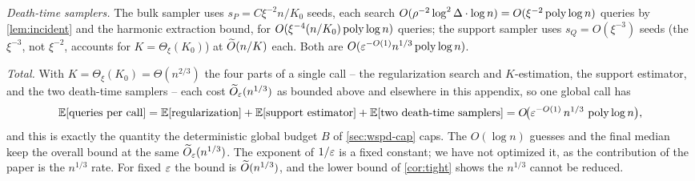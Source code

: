 \emph{Death-time samplers.} The bulk sampler uses $s_P=C\xi^{-2}n/K_0$ seeds, each search $O(\rho^{-2}
\log^2\Delta\cdot\log n)=O(\xi^{-2}\operatorname{poly}\log n)$ queries by \cref{lem:incident} and the harmonic extraction
bound, for $O(\xi^{-4}(n/K_0)\operatorname{poly}\log n)$ queries; the support sampler uses $s_Q=O(\xi^{-3})$ seeds (the
$\xi^{-3}$, not $\xi^{-2}$, accounts for $K=\Theta_\xi(K_0)$) at $\widetilde{O}(n/K)$ each. Both are
$O(\varepsilon^{-O(1)}n^{1/3}\operatorname{poly}\log n)$.

\emph{Total.} With $K=\Theta_\xi(K_0)=\Theta(n^{2/3})$ the four parts of a single call -- the
regularization search and $K$-estimation, the support estimator, and the two death-time samplers --
each cost $\widetilde{O}_\varepsilon(n^{1/3})$ as bounded above and elsewhere in this appendix, so one global call has
\[
  \mathbb{E}[\text{queries per call}]=\mathbb{E}[\text{regularization}]+\mathbb{E}[\text{support estimator}]
   +\mathbb{E}[\text{two death-time samplers}]=O\!\bigl(\varepsilon^{-O(1)}\,n^{1/3}\,\operatorname{poly}\log n\bigr),
\]
and this is exactly the quantity the deterministic global budget $B$ of \cref{sec:wspd-cap} caps. The
$O(\log n)$ guesses and the final median keep the overall bound at the same $\widetilde{O}_\varepsilon(n^{1/3})$.
The exponent of $1/\varepsilon$ is a fixed constant; we have not optimized it, as the contribution of the paper is
the $n^{1/3}$ rate. For fixed $\varepsilon$ the bound is $\widetilde{O}(n^{1/3})$, and the lower bound of \cref{cor:tight}
shows the $n^{1/3}$ cannot be reduced.
